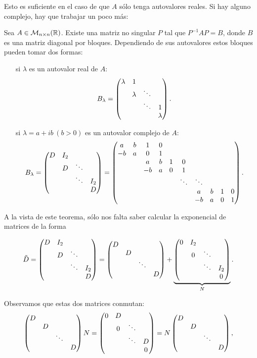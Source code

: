 \documentclass[../ecuaciones_diferenciales.tex]{subfiles}
\begin{document}
Esto es suficiente en el caso de que \(A\) sólo tenga autovalores reales. Si
hay alguno complejo, hay que trabajar un poco más:

\begin{theorem}
	Sea \(A \in \mathcal{M}_{n \times n}(\mathbb{R})\). Existe una matriz no singular
	\(P\) tal que \(P^{-1}AP = B\), donde \(B\) es una matriz diagonal por
	bloques. Dependiendo de sus autovalores estos bloques pueden tomar dos
	formas:
	\begin{enumerate}[align=left]
		\item[si \(\lambda\) es un autovalor real de \(A\):] 
			\[B_\lambda = \begin{pmatrix}\lambda & 1 & & \\ & \lambda & \ddots & \\ & & \ddots & 1 \\ & & & \lambda\end{pmatrix}.\]

		\item[si \(\lambda = a+ib \ (b>0)\) es un autovalor complejo de \(A\):]
			\[B_\lambda = 
				\begin{pmatrix}D & I_2 & & \\ & D & \ddots & \\ & & \ddots & I_2 \\ & & & D\end{pmatrix}
				= \begin{pmatrix}a & b & 1 & 0 \\ -b & a & 0 & 1 
					\\ && a & b & 1 & 0 \\ && -b & a & 0 & 1
					\\ &&&&& \ddots & \ddots 
					 \\ &&&&&& a & b & 1 & 0 \\ &&&&&& -b & a & 0 & 1\end{pmatrix}.\]
	\end{enumerate}
\end{theorem}

A la vista de este teorema, sólo nos falta saber calcular la exponencial de
matrices de la forma

\[\tilde{D} = \begin{pmatrix}D & I_2 & & \\ & D & \ddots & \\ & & \ddots & I_2 \\ & & & D\end{pmatrix} =
	\begin{pmatrix}D & & & \\ & D & & \\ & & \ddots & \\ & & & D\end{pmatrix} +
	\underbrace{\begin{pmatrix}0 & I_2 & & \\ & 0 & \ddots & \\ & & \ddots & I_2 \\ & & &
			0\end{pmatrix}}_{N}.\]

Observamos que estas dos matrices conmutan:
\[\begin{pmatrix}D & & & \\ & D & & \\ & & \ddots & \\ & & & D\end{pmatrix} N =
	\begin{pmatrix}0 & D & & \\ & 0 & \ddots & \\ & & \ddots & D \\ & & & 0\end{pmatrix}
	= N \begin{pmatrix}D & & & \\ & D & & \\ & & \ddots & \\ & & & D\end{pmatrix},\]
\end{document}
